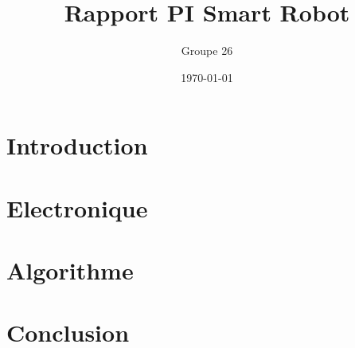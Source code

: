\documentclass[a4paper,12pt]{report}
\title{Rapport PI Smart Robot}
\author{Groupe 26}
\date{\today}
\begin{document}
\maketitle
\tableofcontents
\newpage

\chapter{Introduction}


\chapter{Electronique}


\chapter{Algorithme}


\chapter{Conclusion}


\printbibliography
\end{document}
